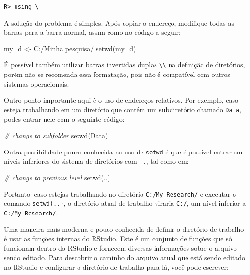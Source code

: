 \documentclass[
  11pt,
]{book}
\newenvironment{Shaded}{\begin{snugshade}}{\end{snugshade}}
\newcommand{\CommentTok}[1]{\textcolor[rgb]{0.37,0.37,0.37}{\textit{#1}}}
\newcommand{\FunctionTok}[1]{\textcolor[rgb]{0,0,0}{#1}}
\newcommand{\NormalTok}[1]{#1}
\newcommand{\OtherTok}[1]{\textcolor[rgb]{0.37,0.37,0.37}{#1}}
\newcommand{\StringTok}[1]{\textcolor[rgb]{0.5,0.5,0.5}{#1}}
\begin{document}
\begin{verbatim}
R> using \
\end{verbatim}

A solução do problema é simples. Após copiar o endereço, modifique todas as barras para a barra normal, assim como no código a seguir:

\begin{Shaded}
\begin{Highlighting}[]
\NormalTok{my\_d }\OtherTok{\textless{}{-}} \StringTok{\textquotesingle{}C:/Minha pesquisa/\textquotesingle{}}
\FunctionTok{setwd}\NormalTok{(my\_d)}
\end{Highlighting}
\end{Shaded}

É possível também utilizar barras invertidas duplas \texttt{\textbackslash{}\textbackslash{}} na definição de diretórios, porém não se recomenda essa formatação, pois não é compatível com outros sistemas operacionais.

Outro ponto importante aqui é o uso de endereços relativos. Por exemplo, caso esteja trabalhando em um diretório que contém um subdiretório chamado \texttt{Data}, podes entrar nele com o seguinte código:

\begin{Shaded}
\begin{Highlighting}[]
\CommentTok{\# change to subfolder}
\FunctionTok{setwd}\NormalTok{(}\StringTok{\textquotesingle{}Data\textquotesingle{}}\NormalTok{)}
\end{Highlighting}
\end{Shaded}

Outra possibilidade pouco conhecida no uso de \texttt{setwd} é que é possível entrar em níveis inferiores do sistema de diretórios com \texttt{..}, tal como em:

\begin{Shaded}
\begin{Highlighting}[]
\CommentTok{\# change to previous level}
\FunctionTok{setwd}\NormalTok{(}\StringTok{\textquotesingle{}..\textquotesingle{}}\NormalTok{)}
\end{Highlighting}
\end{Shaded}

Portanto, caso estejas trabalhando no diretório \texttt{C:/My\ Research/} e executar o comando \texttt{setwd(\textquotesingle{}..\textquotesingle{})}, o diretório atual de trabalho viraria \texttt{C:/}, um nível inferior a \texttt{C:/My\ Research/}.

Uma maneira mais moderna e pouco conhecida de definir o diretório de trabalho é usar as funções internas do RStudio. Este é um conjunto de funções que só funcionam dentro do RStudio e fornecem diversas informações sobre o arquivo sendo editado. Para descobrir o caminho do arquivo atual que está sendo editado no RStudio e configurar o diretório de trabalho para lá, você pode escrever:
\end{document}
